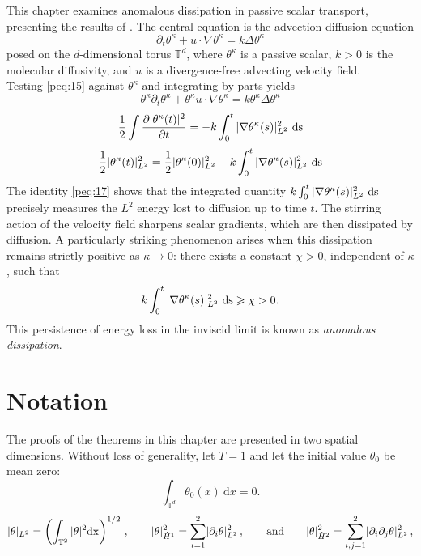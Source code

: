 \documentclass[12pt]{report}   %
\renewcommand{\geq}{\geqslant}
\numberwithin{equation}{section}
\theoremstyle{plain}
\theoremstyle{definition}
\theoremstyle{remark}
\DeclarePairedDelimiter{\abs}{\lvert}{\rvert}
\newcommand{\rd}{\partial}
\begin{document}
This chapter examines anomalous dissipation in passive scalar transport, presenting the results of \cite{DrivasElgindiEA22}. The central equation is the advection-diffusion equation
\begin{equation}
\partial_t{\theta^\kappa} + u\cdot \nabla\theta^\kappa= k\Delta\theta^\kappa \label{peq:15}
\end{equation}
posed on the $d$-dimensional torus $\mathbb{T}^d$, where $\theta^\kappa$ is a passive scalar, $k>0$ is the molecular diffusivity, and $u$ is a divergence-free advecting velocity field. \\
Testing \eqref{peq:15} against $\theta^\kappa$ and integrating by parts yields
\[\theta^\kappa\partial_t\theta^\kappa + \theta^\kappa u\cdot\nabla\theta^\kappa = k\theta^\kappa\Delta\theta^\kappa\]
\[\frac{1}{2}\int\frac{\partial|\theta^\kappa(t)|^2}{\partial t} = -k\int_0^t|\nabla\theta^\kappa(s)|_{L^2}^2 ~\rm{d}s\]
\begin{equation}
\frac{1}{2}|\theta^\kappa(t)|_{L^2}^2 = \frac{1}{2}|\theta^\kappa(0)|_{L^2}^2 -k\int_0^t|\nabla\theta^\kappa(s)|_{L^2}^2 ~\rm{d}s \label{peq:17}
\end{equation}
The identity \eqref{peq:17} shows that the integrated quantity $k\int_0^t|\nabla\theta^\kappa(s)|_{L^2}^2 ~\rm{d}s$ precisely measures the $L^2$ energy lost to diffusion up to time $t$. The stirring action of the velocity field sharpens scalar gradients, which are then dissipated by diffusion. A particularly striking phenomenon arises when this dissipation remains strictly positive as $\kappa \to 0$: there exists a constant $\chi > 0$, independent of $\kappa$, such that
\[k\int_0^t|\nabla\theta^\kappa(s)|_{L^2}^2 ~\rm{d}s \geq \chi >0. \]
This persistence of energy loss in the inviscid limit is known as \textit{anomalous dissipation}.

\section{Notation}
The proofs of the theorems in this chapter are presented in two spatial dimensions. Without loss of generality, let $T = 1$ and let the initial value $\theta_0$ be mean zero:
 \[ \int_{\mathbb{T}^d} \theta_0(x)~ \textrm{d}x =0.\]
 \begin{equation*}
   |\theta |_{L^2} = \left( \int_{\mathbb{T}^2} |\theta |^2 \rm{d} x \right)^{{1}/{2}} \,,
   \qquad
   |\theta |_{\dot{H}^1}^2 =
     \sum_{i=1}^2 \abs{\partial_i \theta}_{L^2}^2\,,
   \qquad\text{and}\qquad
   |\theta |_{\dot{H}^2}^2
     =
     \sum_{i,j=1}^2 \abs{\partial_i \partial_j \theta}_{L^2}^2\,,
 \end{equation*}
 
\end{document}

